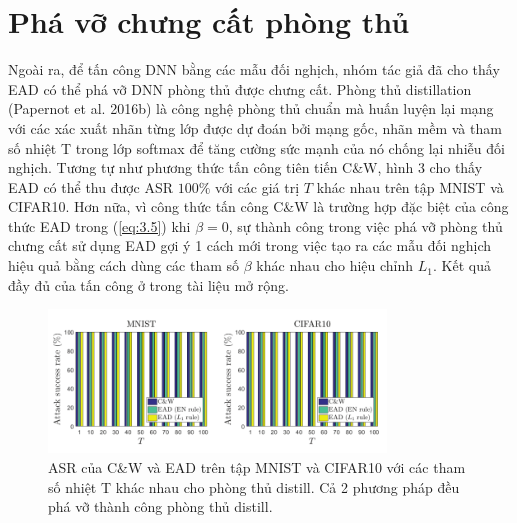 \section{Phá vỡ chưng cất phòng thủ}
Ngoài ra, để tấn công DNN bằng các mẫu đối nghịch, nhóm tác giả đã cho thấy EAD có thể phá vỡ DNN phòng thủ được chưng cất. Phòng thủ distillation (Papernot et al. 2016b) là công nghệ phòng thủ chuẩn mà huấn luyện lại mạng với các xác xuất nhãn từng lớp được dự đoán bởi mạng gốc, nhãn mềm và tham số nhiệt T trong lớp softmax để tăng cường sức mạnh của nó chống lại nhiễu đối nghịch. Tương tự như phương thức tấn công tiên tiến C\&W, hình 3 cho thấy EAD có thể thu được ASR $100\%$ với các giá trị $T$ khác nhau trên tập MNIST và CIFAR10. Hơn nữa, vì công thức tấn công C\&W là trường hợp đặc biệt của công thức EAD trong (\ref{eq:3.5}) khi $\beta = 0$, sự thành công trong việc phá vỡ phòng thủ chưng cất sử dụng EAD gợi ý 1 cách mới trong việc tạo ra các mẫu đối nghịch hiệu quả bằng cách dùng các tham số  $\beta$ khác nhau cho hiệu chỉnh $L_1$. Kết quả đầy đủ của tấn công ở trong tài liệu mở rộng.

\begin{figure}[H] %
    \centering %
    \includegraphics[width=0.8\textwidth]{assets/fig_3.png} 
    \caption{ASR của C\&W và EAD trên tập MNIST và CIFAR10 với các tham số nhiệt T khác nhau cho phòng thủ distill. Cả 2 phương pháp đều phá vỡ thành công phòng thủ distill.} %
    \label{fig:fg_04}
\end{figure}